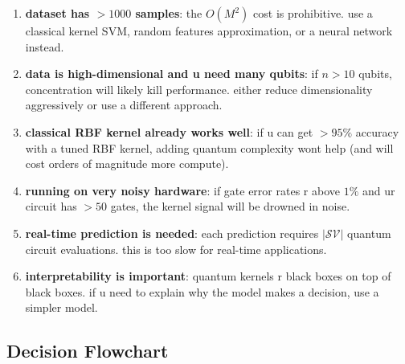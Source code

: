 \documentclass[11pt,a4paper]{article}
\theoremstyle{definition}
\theoremstyle{remark}
\begin{document}
\begin{enumerate}[leftmargin=*]
    \item \textbf{dataset has $> 1000$ samples}: the $O(M^2)$ cost is prohibitive. use a classical kernel SVM, random features approximation, or a neural network instead.

    \item \textbf{data is high-dimensional and u need many qubits}: if $n > 10$ qubits, concentration will likely kill performance. either reduce dimensionality aggressively or use a different approach.

    \item \textbf{classical RBF kernel already works well}: if u can get $> 95\%$ accuracy with a tuned RBF kernel, adding quantum complexity wont help (and will cost orders of magnitude more compute).

    \item \textbf{running on very noisy hardware}: if gate error rates r above $1\%$ and ur circuit has $> 50$ gates, the kernel signal will be drowned in noise.

    \item \textbf{real-time prediction is needed}: each prediction requires $|\mathcal{SV}|$ quantum circuit evaluations. this is too slow for real-time applications.

    \item \textbf{interpretability is important}: quantum kernels r black boxes on top of black boxes. if u need to explain why the model makes a decision, use a simpler model.
\end{enumerate}

\subsection{Decision Flowchart}
\end{document}
